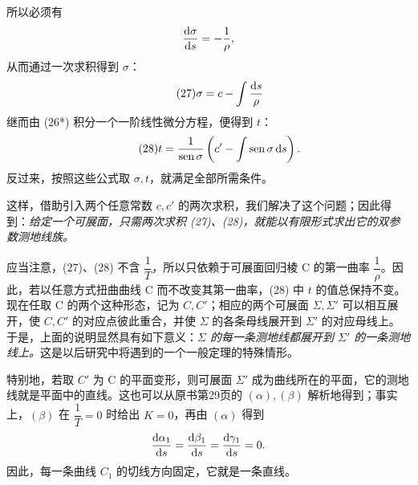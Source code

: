 所以必须有
\[
\frac{\mathrm{d}\sigma}{\mathrm{d} s}=-\frac{1}{\rho},
\]
从而通过一次求积得到 \(\sigma\)：
\begin{equation}\tag{27}
\sigma=c-\int\frac{\mathrm{d} s}{\rho}
\end{equation}
继而由 (26*) 积分一个一阶线性微分方程，便得到 \(t\)：
\begin{equation}\tag{28}
t=\frac{1}{\operatorname{sen}\sigma}\left(c'-\int\operatorname{sen}\sigma\,\mathrm{d} s\right).
\end{equation}
反过来，按照这些公式取 \(\sigma,t\)，就满足全部所需条件。

这样，借助引入两个任意常数 \(c,c'\) 的两次求积，我们解决了这个问题；因此得到：\emph{给定一个可展面，只需两次求积 (27)、(28)，就能以有限形式求出它的双参数测地线族。}

应当注意，(27)、(28) 不含 \(\dfrac{1}{T}\)，所以只依赖于可展面回归棱 C 的第一曲率 \(\dfrac{1}{\rho}\)。因此，若以任意方式扭曲曲线 C 而不改变其第一曲率，(28) 中 \(t\) 的值总保持不变。现在任取 C 的两个这种形态，记为 \(C,C'\)；相应的两个可展面 \(\Sigma,\Sigma'\) 可以相互展开，使 \(C,C'\) 的对应点彼此重合，并使 \(\Sigma\) 的各条母线展开到 \(\Sigma'\) 的对应母线上。于是，上面的说明显然具有如下意义：\emph{\(\Sigma\) 的每一条测地线都展开到 \(\Sigma'\) 的一条测地线上。}这是以后研究中将遇到的一个一般定理的特殊情形。

特别地，若取 \(C'\) 为 C 的平面变形，则可展面 \(\Sigma'\) 成为曲线所在的平面，它的测地线就是平面中的直线。这也可以从原书第29页的 \((\alpha),(\beta)\) 解析地得到；事实上，\((\beta)\) 在 \(\dfrac{1}{T}=0\) 时给出 \(K=0\)，再由 \((\alpha)\) 得到
\[
\frac{\mathrm{d}\alpha_1}{\mathrm{d} s}=\frac{\mathrm{d}\beta_1}{\mathrm{d} s}=\frac{\mathrm{d}\gamma_1}{\mathrm{d} s}=0.
\]
因此，每一条曲线 \(C_1\) 的切线方向固定，它就是一条直线。
